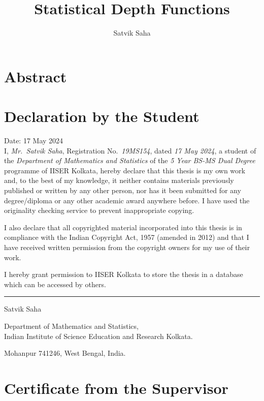 \documentclass[12pt]{report}
\title{Statistical Depth Functions}
\author{Satvik Saha}
\date{}
\begin{document}
    


    \chapter*{Abstract}




    \chapter*{Declaration by the Student}

    Date: 17 May 2024\\

    I, \textit{Mr.~Satvik Saha}, Registration No.~\textit{19MS154}, dated
    \textit{17 May 2024}, a student of the \textit{Department of Mathematics
    and Statistics} of the \textit{5 Year BS-MS Dual Degree} programme of
    IISER Kolkata, hereby declare that this thesis is my own work and, to the
    best of my knowledge, it neither contains materials previously published
    or written by any other person, nor has it been submitted for any
    degree/diploma or any other academic award anywhere before.
    I have used the originality checking service to prevent inappropriate
    copying.

    I also declare that all copyrighted material incorporated into this thesis
    is in compliance with the Indian Copyright Act, 1957 (amended in 2012) and
    that I have received written permission from the copyright owners for my
    use of their work.

    I hereby grant permission to IISER Kolkata to store the thesis in a
    database which can be accessed by others.


    \vspace{5em}
    \rule{0.4\textwidth}{0.8pt}

    \vspace{0.1em}
    Satvik Saha

    Department of Mathematics and Statistics,\\
    Indian Institute of Science Education and Research Kolkata.

    Mohanpur 741246, West Bengal, India.

    \chapter*{Certificate from the Supervisor}
\end{document}
